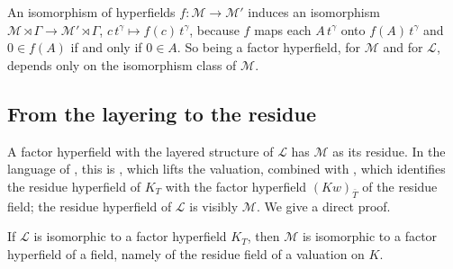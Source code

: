 \documentclass[11pt]{amsart}
\numberwithin{equation}{section}
\newcommand{\Mas}{\mathcal M}
\newcommand{\Lay}{\mathcal L}
\newcommand{\lt}[2]{#1\,t^{#2}}
\begin{document}
An isomorphism of hyperfields $f\colon\Mas\to\Mas'$ induces an isomorphism $\Mas\rtimes\Gamma\to\Mas'\rtimes\Gamma$, $c\,t^\gamma\mapsto f(c)\,t^\gamma$, because $f$ maps each $\lt{A}{\gamma}$ onto $\lt{f(A)}{\gamma}$ and $0\in f(A)$ if and only if $0\in A$. So being a factor hyperfield, for $\Mas$ and for $\Lay$, depends only on the isomorphism class of $\Mas$.

\subsection{From the layering to the residue}
A factor hyperfield with the layered structure of $\Lay$ has $\Mas$ as its residue. In the language of \cite{Linzi25}, this is \cite[Lemma~3.6]{Linzi25}, which lifts the valuation, combined with \cite[Proposition~3.14]{Linzi25}, which identifies the residue hyperfield of $K_T$ with the factor hyperfield $(Kw)_{\bar T}$ of the residue field; the residue hyperfield of $\Lay$ is visibly $\Mas$. We give a direct proof.

\begin{proposition}\label{prop:residue}
If $\Lay$ is isomorphic to a factor hyperfield $K_T$, then $\Mas$ is isomorphic to a factor hyperfield of a field, namely of the residue field of a valuation on $K$.
\end{proposition}
\end{document}
